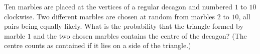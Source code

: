 Ten marbles are placed at the vertices of a regular decagon and numbered $1$ to $10$ clockwise. Two different marbles are chosen at random from marbles $2$ to $10$, all pairs being equally likely. What is the probability that the triangle formed by marble $1$ and the two chosen marbles contains the centre of the decagon? (The centre counts as contained if it lies on a side of the triangle.)
